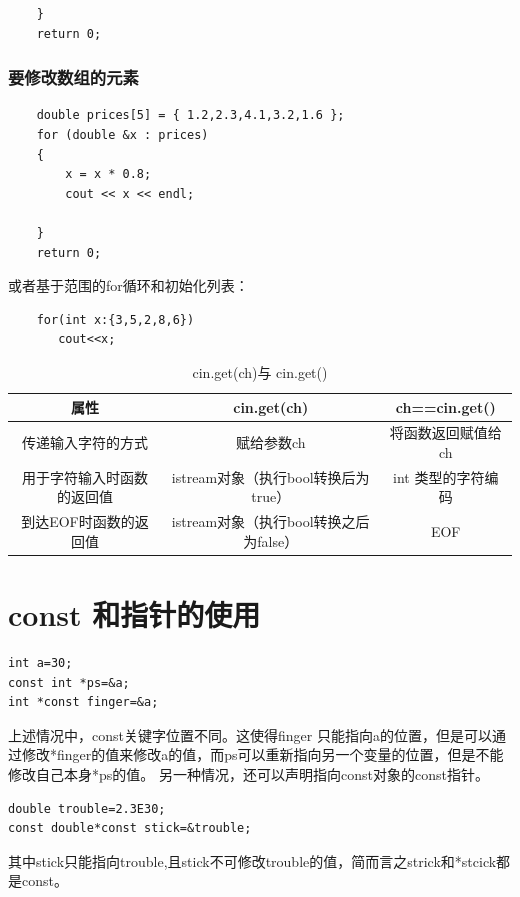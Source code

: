\documentclass[a4paper,12pt]{article}
\begin{document}
\begin{spacing}{2}
\begin{lstlisting}
	}
	return 0;
\end{lstlisting}
\subsubsection{要修改数组的元素}
\begin{lstlisting}
    double prices[5] = { 1.2,2.3,4.1,3.2,1.6 };
	for (double &x : prices)
	{
		x = x * 0.8;
		cout << x << endl;

	}
	return 0;
\end{lstlisting}
或者基于范围的for循环和初始化列表：
\begin{lstlisting}
    for(int x:{3,5,2,8,6})
       cout<<x;
\end{lstlisting}
\begin{center}
\begin{table}[ht]
\caption{cin.get(ch)与 cin.get()} %
\centering %
\begin{tabular}{c|c|c  } %
\hline\hline %
属性 &cin.get(ch) &ch==cin.get() \\ [0.5ex] %
\hline %
 传递输入字符的方式& 赋给参数ch & 将函数返回赋值给ch  \\
 \hline
用于字符输入时函数的返回值 & istream对象（执行bool转换后为true） & int 类型的字符编码  \\
\hline
到达EOF时函数的返回值& istream对象（执行bool转换之后为false） &EOF  \\
\hline %
\end{tabular}
\label{table:nonlin} %
\end{table}
\end{center}
\section{const 和指针的使用}
\begin{lstlisting}
int a=30;
const int *ps=&a;
int *const finger=&a;
\end{lstlisting}
上述情况中，const关键字位置不同。这使得finger 只能指向a的位置，但是可以通过修改*finger的值来修改a的值，而ps可以重新指向另一个变量的位置，但是不能修改自己本身*ps的值。
另一种情况，还可以声明指向const对象的const指针。
\begin{lstlisting}
double trouble=2.3E30;
const double*const stick=&trouble;
\end{lstlisting}
其中stick只能指向trouble,且stick不可修改trouble的值，简而言之strick和*stcick都是const。 
\end{spacing}
\end{document}
